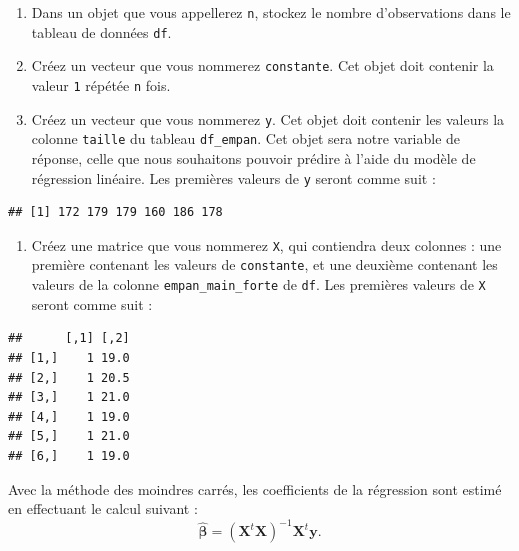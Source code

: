 \documentclass[
  11pt,
]{book}
\providecommand{\tightlist}{%
  \setlength{\itemsep}{0pt}\setlength{\parskip}{0pt}}
\numberwithin{equation}{section}
\numberwithin{countremarque}{section}
\newenvironment{greenbox}{
  \begin{tcolorbox}[breakable, colback=vert,coltext=black,
                  colframe=grisfonce]}
 {\end{tcolorbox}}
\begin{document}
\begin{greenbox}

\begin{enumerate}
\def\labelenumi{\arabic{enumi}.}
\setcounter{enumi}{2}
\tightlist
\item
  Dans un objet que vous appellerez \texttt{n}, stockez le nombre d'observations dans le tableau de données \texttt{df}.
\item
  Créez un vecteur que vous nommerez \texttt{constante}. Cet objet doit contenir la valeur \texttt{1} répétée \texttt{n} fois.
\item
  Créez un vecteur que vous nommerez \texttt{y}. Cet objet doit contenir les valeurs la colonne \texttt{taille} du tableau \texttt{df\_empan}. Cet objet sera notre variable de réponse, celle que nous souhaitons pouvoir prédire à l'aide du modèle de régression linéaire. Les premières valeurs de \texttt{y} seront comme suit :
\end{enumerate}

\begin{lstlisting}
## [1] 172 179 179 160 186 178
\end{lstlisting}

\begin{enumerate}
\def\labelenumi{\arabic{enumi}.}
\setcounter{enumi}{5}
\tightlist
\item
  Créez une matrice que vous nommerez \texttt{X}, qui contiendra deux colonnes : une première contenant les valeurs de \texttt{constante}, et une deuxième contenant les valeurs de la colonne \texttt{empan\_main\_forte} de \texttt{df}. Les premières valeurs de \texttt{X} seront comme suit :
\end{enumerate}

\begin{lstlisting}
##      [,1] [,2]
## [1,]    1 19.0
## [2,]    1 20.5
## [3,]    1 21.0
## [4,]    1 19.0
## [5,]    1 21.0
## [6,]    1 19.0
\end{lstlisting}

\end{greenbox}

Avec la méthode des moindres carrés, les coefficients de la régression sont estimé en effectuant le calcul suivant :
\[\hat{\boldsymbol\beta} = (\boldsymbol X^t \boldsymbol X)^{-1} \boldsymbol X^t \boldsymbol y.\]
\end{document}
